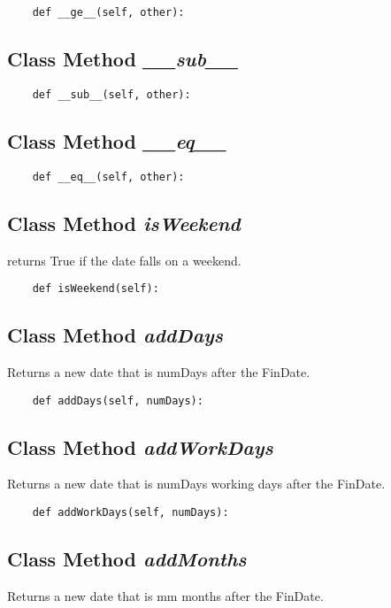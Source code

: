 \documentclass[twoside,11pt]{book}
\begin{document}
\begin{lstlisting}
    def __ge__(self, other):
\end{lstlisting}

\subsection{Class Method {\it \_\_sub\_\_}}


\begin{lstlisting}
    def __sub__(self, other):
\end{lstlisting}

\subsection{Class Method {\it \_\_eq\_\_}}


\begin{lstlisting}
    def __eq__(self, other):
\end{lstlisting}

\subsection{Class Method {\it isWeekend}}
returns True if the date falls on a weekend. 

\begin{lstlisting}
    def isWeekend(self):
\end{lstlisting}

\subsection{Class Method {\it addDays}}
Returns a new date that is numDays after the FinDate. 

\begin{lstlisting}
    def addDays(self, numDays):
\end{lstlisting}

\subsection{Class Method {\it addWorkDays}}
Returns a new date that is numDays working days after the FinDate. 

\begin{lstlisting}
    def addWorkDays(self, numDays):
\end{lstlisting}

\subsection{Class Method {\it addMonths}}
Returns a new date that is mm months after the FinDate. 
\end{document}
